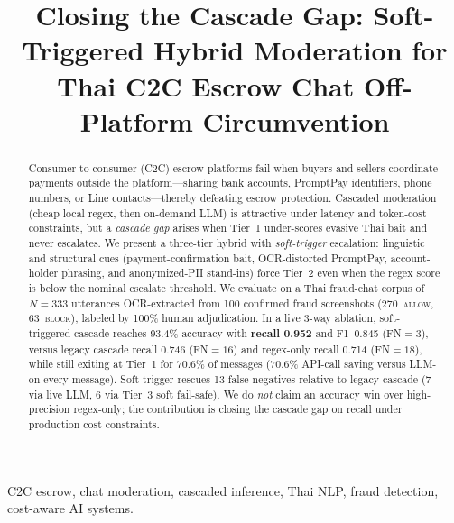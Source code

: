 \documentclass[conference]{IEEEtran}
\begin{document}
\title{Closing the Cascade Gap: Soft-Triggered Hybrid Moderation
for Thai C2C Escrow Chat Off-Platform Circumvention}

\author{
}

\maketitle

\begin{abstract}
Consumer-to-consumer (C2C) escrow platforms fail when buyers and sellers
coordinate payments outside the platform---sharing bank accounts, PromptPay
identifiers, phone numbers, or Line contacts---thereby defeating escrow
protection. Cascaded moderation (cheap local regex, then on-demand LLM) is
attractive under latency and token-cost constraints, but a \emph{cascade gap}
arises when Tier~1 under-scores evasive Thai bait and never escalates.
We present a three-tier hybrid with \emph{soft-trigger} escalation: linguistic
and structural cues (payment-confirmation bait, OCR-distorted PromptPay,
account-holder phrasing, and anonymized-PII stand-ins) force Tier~2 even when
the regex score is below the nominal escalate threshold. We evaluate on a Thai
fraud-chat corpus of $N{=}333$ utterances OCR-extracted from 100 confirmed
fraud screenshots (270~\textsc{allow}, 63~\textsc{block}), labeled by 100\%
human adjudication. In a live 3-way ablation, soft-triggered cascade reaches
93.4\% accuracy with \textbf{recall 0.952} and F1~0.845 (FN$=3$), versus
legacy cascade recall 0.746 (FN$=16$) and regex-only recall 0.714 (FN$=18$),
while still exiting at Tier~1 for 70.6\% of messages (70.6\% API-call saving
versus LLM-on-every-message). Soft trigger rescues 13 false negatives relative
to legacy cascade (7 via live LLM, 6 via Tier~3 soft fail-safe). We do
\emph{not} claim an accuracy win over high-precision regex-only; the
contribution is closing the cascade gap on recall under production cost
constraints.
\end{abstract}

\begin{IEEEkeywords}
C2C escrow, chat moderation, cascaded inference, Thai NLP, fraud detection,
cost-aware AI systems.
\end{IEEEkeywords}
\end{document}
